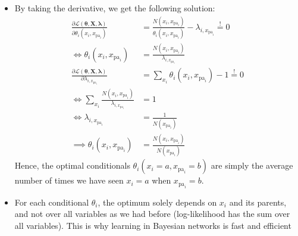 \begin{itemize}
	\item By taking the derivative, we get the following solution:
	\begin{equation*}
		\begin{split}
			\frac{\partial \mathcal{L}(\bm{\theta}, \bm{X}, \bm{\lambda})}{\partial \theta_i(x_i, x_{\text{pa}_i})} & = \frac{N(x_i, x_{\text{pa}_i})}{\theta_i(x_i, x_{\text{pa}_i})} - \lambda_{i,x_{\text{pa}_i}} \overset{!}{=} 0\\
			\Leftrightarrow \theta_i(x_i, x_{\text{pa}_i}) & = \frac{N(x_i, x_{\text{pa}_i})}{\lambda_{i,x_{\text{pa}_i}}}\\[8pt]
			\frac{\partial \mathcal{L}(\bm{\theta}, \bm{X}, \bm{\lambda})}{\partial \lambda_{i,x_{\text{pa}_i}}} & = \sum_{x_i} \theta_i(x_i, x_{\text{pa}_i}) - 1 \overset{!}{=} 0\\
			\Leftrightarrow \sum_{x_i} \frac{N(x_i, x_{\text{pa}_i})}{\lambda_{i,x_{\text{pa}_i}}} & = 1\\
			\Leftrightarrow \lambda_{i,x_{\text{pa}_i}} & = \frac{1}{N(x_{\text{pa}_i})}\\[8pt]
			\implies \theta_i(x_i, x_{\text{pa}_i}) & = \frac{N(x_i, x_{\text{pa}_i})}{N(x_{\text{pa}_i})}
		\end{split}
	\end{equation*}
	Hence, the optimal conditionals $\theta_i(x_i=a, x_{\text{pa}_i}=b)$ are simply the average number of times we have seen $x_i=a$ when $x_{\text{pa}_i}=b$.
	\item For each conditional $\theta_i$, the optimum solely depends on $x_i$ and its parents, and not over all variables as we had before (log-likelihood has the sum over all variables). This is why learning in Bayesian networks is fast and efficient
\end{itemize}
